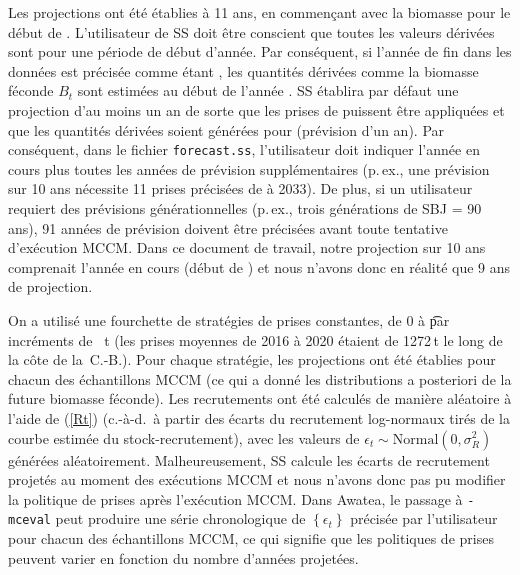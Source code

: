 \documentclass[11pt]{book}
\newcommand{\code}[1]{\normalsize\texttt{#1}\normalsize}%
\newcommand{\eref}[1]{(\ref{#1})}
\begin{document}
Les projections ont \'{e}t\'{e} \'{e}tablies \`{a} 11 ans, en commen\c{c}ant avec la biomasse pour le d\'{e}but de \currYear.
L'utilisateur de SS doit \^{e}tre conscient que toutes les valeurs d\'{e}riv\'{e}es sont pour une p\'{e}riode de d\'{e}but d'ann\'{e}e.
Par cons\'{e}quent, si l'ann\'{e}e de fin dans les donn\'{e}es est pr\'{e}cis\'{e}e comme \'{e}tant \prevYear, les quantit\'{e}s d\'{e}riv\'{e}es comme la biomasse f\'{e}conde $B_t$ sont estim\'{e}es au d\'{e}but de l'ann\'{e}e \prevYear.
SS \'{e}tablira par d\'{e}faut une projection d'au moins un an de sorte que les prises de \prevYear{} puissent \^{e}tre appliqu\'{e}es et que les quantit\'{e}s d\'{e}riv\'{e}es soient g\'{e}n\'{e}r\'{e}es pour \currYear{} (pr\'{e}vision d'un an).
Par cons\'{e}quent, dans le fichier \code{forecast.ss}, l'utilisateur doit indiquer l'ann\'{e}e en cours plus toutes les ann\'{e}es de pr\'{e}vision suppl\'{e}mentaires (p.\,ex., une pr\'{e}vision sur 10 ans n\'{e}cessite 11 prises pr\'{e}cis\'{e}es de \currYear{} \`{a} 2033).
De plus, si un utilisateur requiert des pr\'{e}visions g\'{e}n\'{e}rationnelles (p.\,ex., trois g\'{e}n\'{e}rations de SBJ = 90 ans), 91 ann\'{e}es de pr\'{e}vision doivent \^{e}tre pr\'{e}cis\'{e}es avant toute tentative d'ex\'{e}cution MCCM.
Dans ce document de travail, notre projection sur 10 ans comprenait l'ann\'{e}e en cours (d\'{e}but de \currYear) et nous n'avons donc en r\'{e}alit\'{e} que 9 ans de projection.

On a utilis\'{e} une fourchette de strat\'{e}gies de prises constantes, de 0 \`{a} \policyMax\t par incr\'{e}ments de \policyInc\ t (les prises moyennes de 2016 \`{a} 2020 \'{e}taient de 1272\,t le long de la c\^{o}te de la~C.-B.).
Pour chaque strat\'{e}gie, les projections ont \'{e}t\'{e} \'{e}tablies pour chacun des \Nbase{} \'{e}chantillons MCCM (ce qui a donn\'{e} les distributions a posteriori de la future biomasse f\'{e}conde).
Les recrutements ont \'{e}t\'{e} calcul\'{e}s de mani\`{e}re al\'{e}atoire \`{a} l'aide de \eref{Rt} (c.-\`{a}-d.~\`{a} partir des \'{e}carts du recrutement log-normaux tir\'{e}s de la courbe estim\'{e}e du stock-recrutement), avec les valeurs de $\epsilon_t \sim \mbox{Normal}(0, \sigma_R^2)$ g\'{e}n\'{e}r\'{e}es al\'{e}atoirement.
Malheureusement, SS calcule les \'{e}carts de recrutement projet\'{e}s au moment des ex\'{e}cutions MCCM et nous n'avons donc pas pu modifier la politique de prises apr\`{e}s l'ex\'{e}cution MCCM.
Dans Awatea, le passage \`{a} \code{-mceval} peut produire une s\'{e}rie chronologique de $\left\{ \epsilon_t \right\}$ pr\'{e}cis\'{e}e par l'utilisateur pour chacun des \'{e}chantillons MCCM, ce qui signifie que les politiques de prises peuvent varier en fonction du nombre d'ann\'{e}es projet\'{e}es.
\end{document}
